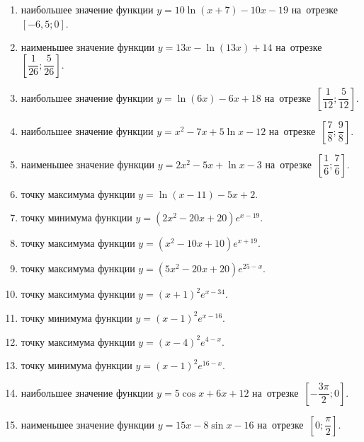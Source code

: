 \documentclass[a4paper,10pt]{article}
\begin{document}
\begin{enumerate}
\item {} наибольшее значение функции $y = 10\ln \left(x+7\right)-10x -19$ на~отрезке~$\left[-6,5;0\right]$.

\item {} наименьшее значение функции $y = 13x-\ln \left(13x\right)+14$ на~отрезке~$\left[\dfrac{1}{26};\dfrac{5}{26}\right]$.

\item {} наибольшее значение функции $y = \ln \left(6x\right)-6x+18$ на~отрезке~$\left[\dfrac{1}{12};\dfrac{5}{12}\right]$.

\item {} наибольшее значение функции $y=x^2-7x+5\ln x-12$ на~отрезке~$\left[\dfrac{7}{8};\dfrac{9}{8}\right]$.

\item {} наименьшее значение функции $y=2x^2-5x+\ln x-3$ на~отрезке~$\left[\dfrac{1}{6};\dfrac{7}{6}\right]$.

\item {} точку максимума функции $y=\ln \left(x-11\right)-5x+2$.

\item {} точку минимума функции $y=\left(2x^2-20x+20\right)e^{x-19}$.

\item {} точку максимума функции $y=\left(x^2-10x+10\right)e^{x+19}$.

\item {} точку максимума функции $y=\left(5x^2-20x+20\right)e^{25-x}$.

\item {} точку максимума функции $y=\left(x +1\right)^2e^{x-34}$.

\item {} точку минимума функции $y=\left(x -1\right)^2e^{x-16}$.

\item {} точку максимума функции $y=\left(x -4\right)^2e^{4-x}$.

\item {} точку минимума функции $y=\left(x -1\right)^2e^{16-x}$.

\item {} наибольшее значение функции $y=5\cos x+6x +12$ на~отрезке~$\left[-\dfrac{3\pi }{2};0\right]$.

\item {} наименьшее значение функции $y=15x-8\sin x -16$ на~отрезке~$\left[0;\dfrac{\pi }{2}\right]$.


\end{enumerate}
\end{document}
